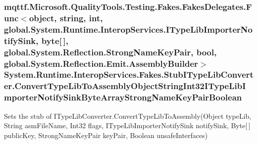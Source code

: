 \hypertarget{class_system_1_1_runtime_1_1_interop_services_1_1_fakes_1_1_stub_i_type_lib_converter_a2ccea0484704803e6603bb2b45f4d7fb}{
\subsubsection[{Convert\-Type\-Lib\-To\-Assembly\-Object\-String\-Int32\-I\-Type\-Lib\-Importer\-Notify\-Sink\-Byte\-Array\-Strong\-Name\-Key\-Pair\-Boolean}]{\setlength{\rightskip}{0pt plus 5cm}mqttf.\-Microsoft.\-Quality\-Tools.\-Testing.\-Fakes.\-Fakes\-Delegates.\-Func$<$object, string, int, global.\-System.\-Runtime.\-Interop\-Services.\-I\-Type\-Lib\-Importer\-Notify\-Sink, byte\mbox{[}$\,$\mbox{]}, global.\-System.\-Reflection.\-Strong\-Name\-Key\-Pair, bool, global.\-System.\-Reflection.\-Emit.\-Assembly\-Builder$>$ System.\-Runtime.\-Interop\-Services.\-Fakes.\-Stub\-I\-Type\-Lib\-Converter.\-Convert\-Type\-Lib\-To\-Assembly\-Object\-String\-Int32\-I\-Type\-Lib\-Importer\-Notify\-Sink\-Byte\-Array\-Strong\-Name\-Key\-Pair\-Boolean}}\label{class_system_1_1_runtime_1_1_interop_services_1_1_fakes_1_1_stub_i_type_lib_converter_a2ccea0484704803e6603bb2b45f4d7fb}


Sets the stub of I\-Type\-Lib\-Converter.\-Convert\-Type\-Lib\-To\-Assembly(\-Object type\-Lib, String asm\-File\-Name, Int32 flags, I\-Type\-Lib\-Importer\-Notify\-Sink notify\-Sink, Byte\mbox{[}$\,$\mbox{]} public\-Key, Strong\-Name\-Key\-Pair key\-Pair, Boolean unsafe\-Interfaces)


